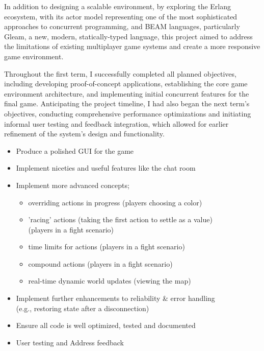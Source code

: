 \documentclass[]{final}
\begin{document}
In addition to designing a scalable environment,
by exploring the Erlang ecosystem, with its actor model representing one of the
most sophisticated approaches to concurrent programming, and
BEAM languages, particularly Gleam, a new, modern, statically-typed language,
this project aimed to address the limitations of existing multiplayer
game systems and create a more responsive game environment.

Throughout the first term, I successfully completed all planned objectives,
including developing proof-of-concept applications,
establishing the core game environment architecture, and implementing initial
concurrent features for the final game. Anticipating the project timeline,
I had also began the next term's objectives, conducting comprehensive performance
optimizations and initiating informal user testing and feedback integration,
which allowed for earlier refinement of the system's design and functionality.



\begin{itemize}
  \item Produce a polished GUI for the game
  \item Implement niceties and useful features like the chat room
  \item Implement more advanced concepts;
        \begin{itemize}
          \item overriding actions in progress (players choosing a color)
          \item 'racing' actions (taking the first action to settle as a value)\\(players in a fight scenario)
          \item time limits for actions (players in a fight scenario)
          \item compound actions (players in a fight scenario)
          \item real-time dynamic world updates (viewing the map)
        \end{itemize}
  \item Implement further enhancements to reliability \& error handling\\(e.g., restoring state after a disconnection)
  \item Ensure all code is well optimized, tested and documented
  \item User testing and Address feedback
\end{itemize}
\end{document}
